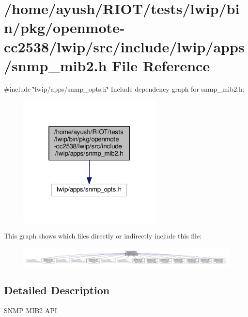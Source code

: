 \hypertarget{openmote-cc2538_2lwip_2src_2include_2lwip_2apps_2snmp__mib2_8h}{}\section{/home/ayush/\+R\+I\+O\+T/tests/lwip/bin/pkg/openmote-\/cc2538/lwip/src/include/lwip/apps/snmp\+\_\+mib2.h File Reference}
\label{openmote-cc2538_2lwip_2src_2include_2lwip_2apps_2snmp__mib2_8h}
{\ttfamily \#include \char`\"{}lwip/apps/snmp\+\_\+opts.\+h\char`\"{}}\newline
Include dependency graph for snmp\+\_\+mib2.\+h\+:
\nopagebreak
\begin{figure}[H]
\begin{center}
\leavevmode
\includegraphics[width=205pt]{openmote-cc2538_2lwip_2src_2include_2lwip_2apps_2snmp__mib2_8h__incl}
\end{center}
\end{figure}
This graph shows which files directly or indirectly include this file\+:
\nopagebreak
\begin{figure}[H]
\begin{center}
\leavevmode
\includegraphics[width=350pt]{openmote-cc2538_2lwip_2src_2include_2lwip_2apps_2snmp__mib2_8h__dep__incl}
\end{center}
\end{figure}


\subsection{Detailed Description}
S\+N\+MP M\+I\+B2 A\+PI 
